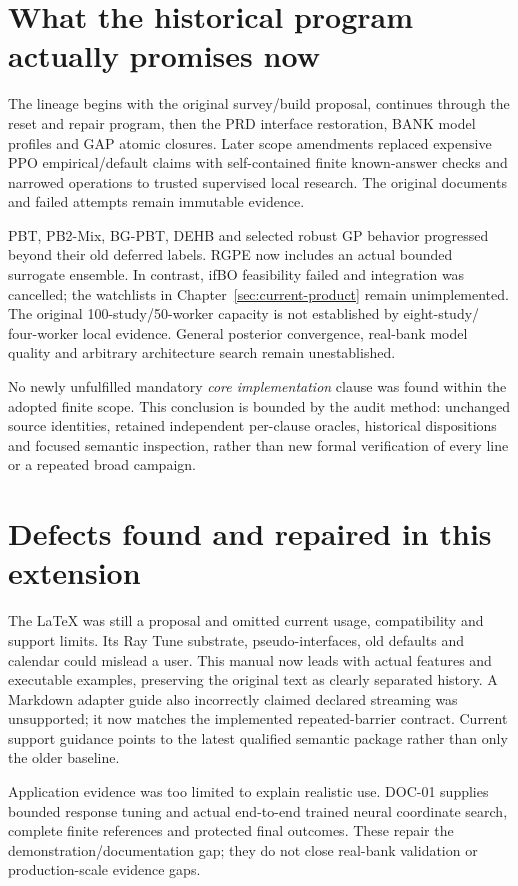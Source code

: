 \section{What the historical program actually promises now}

The lineage begins with the original survey/build proposal, continues through
the reset and repair program, then the PRD interface restoration, BANK model
profiles and GAP atomic closures. Later scope amendments replaced expensive
PPO empirical/default claims with self-contained finite known-answer checks and
narrowed operations to trusted supervised local research. The original
documents and failed attempts remain immutable evidence.

PBT, PB2-Mix, BG-PBT, DEHB and selected robust GP behavior progressed beyond
their old deferred labels. RGPE now includes an actual bounded surrogate
ensemble. In contrast, ifBO feasibility failed and integration was cancelled;
the watchlists in Chapter~\ref{sec:current-product} remain unimplemented.
The original 100-study/50-worker capacity is not established by eight-study/
four-worker local evidence. General posterior convergence, real-bank model
quality and arbitrary architecture search remain unestablished.

No newly unfulfilled mandatory \emph{core implementation} clause was found
within the adopted finite scope. This conclusion is bounded by the audit
method: unchanged source identities, retained independent per-clause oracles,
historical dispositions and focused semantic inspection, rather than new
formal verification of every line or a repeated broad campaign.

\section{Defects found and repaired in this extension}

The LaTeX was still a proposal and omitted current usage, compatibility and
support limits. Its Ray Tune substrate, pseudo-interfaces, old defaults and
calendar could mislead a user. This manual now leads with actual features and
executable examples, preserving the original text as clearly separated history.
A Markdown adapter guide also incorrectly claimed declared streaming was
unsupported; it now matches the implemented repeated-barrier contract. Current
support guidance points to the latest qualified semantic package rather than
only the older baseline.

Application evidence was too limited to explain realistic use. DOC-01 supplies
bounded response tuning and actual end-to-end trained neural coordinate search,
complete finite references and protected final outcomes. These repair the
demonstration/documentation gap; they do not close real-bank validation or
production-scale evidence gaps.

